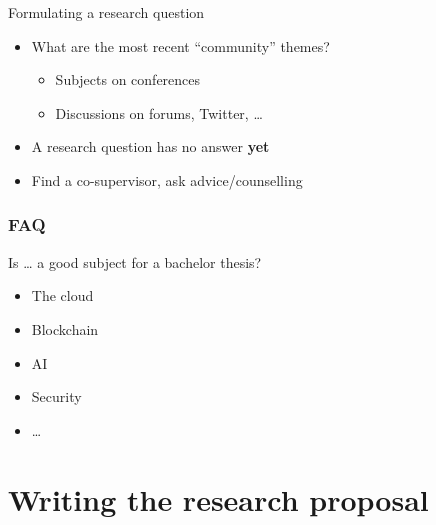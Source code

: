 \documentclass[aspectratio=169]{beamer}
\begin{document}
    \begin{frame}{Formulating a research question}
        
        \begin{itemize}
            \item What are the most recent ``community'' themes?
            \begin{itemize}
                \item Subjects on conferences
                \item Discussions on forums, Twitter, \ldots
            \end{itemize}
            \item A research question has no answer \textbf{yet} 
            \item Find a co-supervisor, ask advice/counselling
        \end{itemize}
        
    \end{frame}
    
    \begin{frame}[plain]
        \frametitle{FAQ}
        
        Is \ldots{} a good subject for a bachelor thesis?
        
        \begin{itemize}
            \item The cloud
            \item Blockchain
            \item AI
            \item Security
            \item \ldots
        \end{itemize}
        
        \bigskip
        
    \end{frame}
    
    \section{Writing the research proposal}
    
\end{document}
